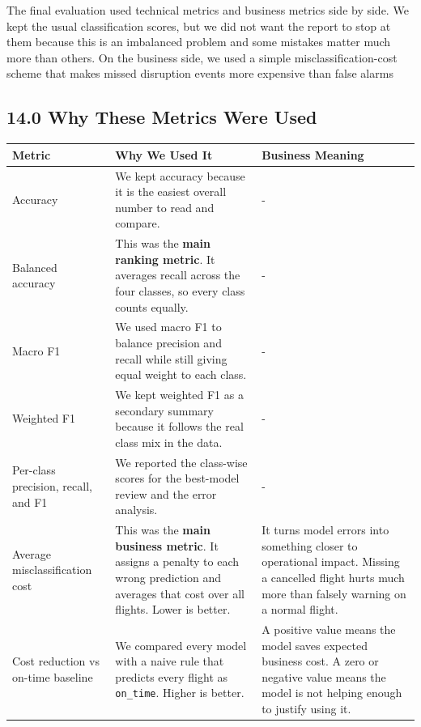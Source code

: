 \documentclass{article}
\newcommand{\code}[1]{\texttt{\small #1}}
\begin{document}
The final evaluation used technical metrics and business metrics side by side. We kept the usual classification scores, but we did not want the report to stop at them because this is an imbalanced problem and some mistakes matter much more than others. On the business side, we used a simple misclassification-cost scheme that makes missed disruption events more expensive than false alarms

\subsection*{\textcolor{accentgold}{14.0 Why These Metrics Were Used}}

\begin{tcolorbox}[mainbox, title={What Each Metric Tells Us}]
\renewcommand{\arraystretch}{1.35}
\small
\begin{tabularx}{\textwidth}{L{3.1cm} L{4.3cm} X}
    \toprule
    \textbf{Metric} & \textbf{Why We Used It} & \textbf{Business Meaning} \\
    \midrule
    Accuracy & We kept accuracy because it is the easiest overall number to read and compare. & - \\
    Balanced accuracy & This was the \textbf{main ranking metric}. It averages recall across the four classes, so every class counts equally. &- \\
    Macro F1 & We used macro F1 to balance precision and recall while still giving equal weight to each class. & - \\
    Weighted F1 & We kept weighted F1 as a secondary summary because it follows the real class mix in the data. & - \\
    Per-class precision, recall, and F1 & We reported the class-wise scores for the best-model review and the error analysis. & - \\
    Average misclassification cost & This was the \textbf{main business metric}. It assigns a penalty to each wrong prediction and averages that cost over all flights. Lower is better. & It turns model errors into something closer to operational impact. Missing a cancelled flight hurts much more than falsely warning on a normal flight. \\
    Cost reduction vs on-time baseline & We compared every model with a naive rule that predicts every flight as \code{on\_time}. Higher is better. & A positive value means the model saves expected business cost. A zero or negative value means the model is not helping enough to justify using it. \\
    \bottomrule
\end{tabularx}
\end{tcolorbox}
\end{document}
